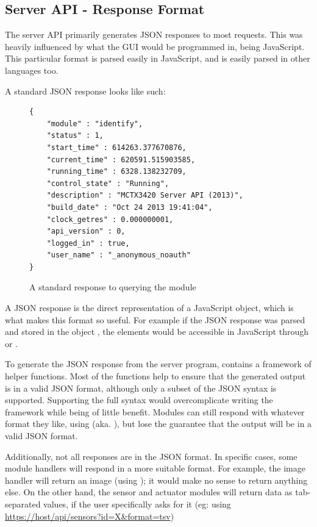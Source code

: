 \subsection{Server API - Response Format}

The server API primarily generates JSON responses to most requests. This was heavily influenced by what the GUI would be programmed in, being JavaScript. This particular format is parsed easily in JavaScript, and is easily parsed in other languages too. 

A standard JSON response looks like such:

\begin{figure}[H]
	\centering
\begin{verbatim}
{
    "module" : "identify",
    "status" : 1,
    "start_time" : 614263.377670876,
    "current_time" : 620591.515903585,
    "running_time" : 6328.138232709,
    "control_state" : "Running",
    "description" : "MCTX3420 Server API (2013)",
    "build_date" : "Oct 24 2013 19:41:04",
    "clock_getres" : 0.000000001,
    "api_version" : 0,
    "logged_in" : true,
    "user_name" : "_anonymous_noauth"
}
\end{verbatim} 
	\caption{A standard response to querying the  module}
	\label{fastcgi.c-flow-chart.pdf}
\end{figure}

A JSON response is the direct representation of a JavaScript object, which is what makes this format so useful. For example if the JSON response was parsed and stored in the object , the elements would be accessible in JavaScript through  or .

To generate the JSON response from the server program,  contains a framework of helper functions. Most of the functions help to ensure that the generated output is in a valid JSON format, although only a subset of the JSON syntax is supported. Supporting the full syntax would overcomplicate writing the framework while being of little benefit. Modules can still respond with whatever format they like, using  (aka. ), but lose the guarantee that the output will be in a valid JSON format. 

Additionally, not all responses are in the JSON format. In specific cases, some module handlers will respond in a more suitable format. For example, the image handler will return an image (using ); it would make no sense to return anything else. On the other hand, the sensor and actuator modules will return data as tab-separated values, if the user specifically asks for it (eg: using \url{https://host/api/sensors?id=X&format=tsv})


